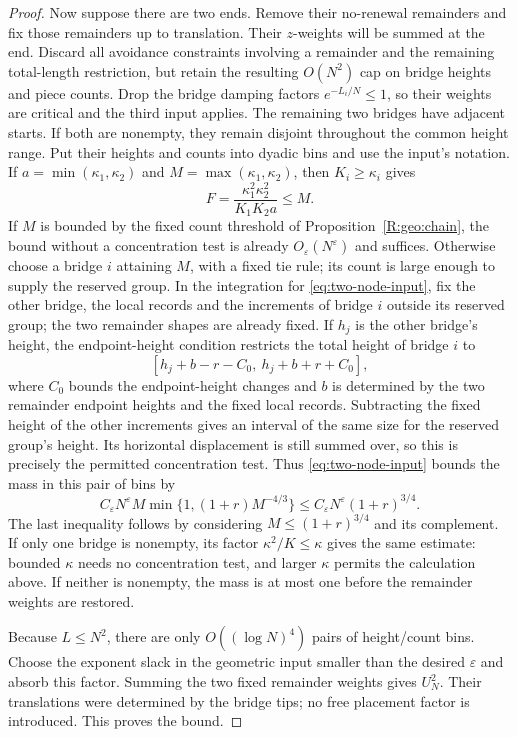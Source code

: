 \begin{proof}
Now suppose there are two ends. Remove their no-renewal remainders and fix those remainders up to translation. Their $z$-weights will be summed at the end. Discard all avoidance constraints involving a remainder and the remaining total-length restriction, but retain the resulting $O(N^2)$ cap on bridge heights and piece counts. Drop the bridge damping factors $e^{-L_i/N}\le1$, so their weights are critical and the third input applies. The remaining two bridges have adjacent starts. If both are nonempty, they remain disjoint throughout the common height range. Put their heights and counts into dyadic bins and use the input's notation. If $a=\min(\kappa_1,\kappa_2)$ and $M=\max(\kappa_1,\kappa_2)$, then $K_i\ge\kappa_i$ gives
\[
 F=\frac{\kappa_1^2\kappa_2^2}{K_1K_2a}\le M.
\]
If $M$ is bounded by the fixed count threshold of Proposition~\ref{R:geo:chain}, the bound without a concentration test is already $O_\varepsilon(N^\varepsilon)$ and suffices. Otherwise choose a bridge $i$ attaining $M$, with a fixed tie rule; its count is large enough to supply the reserved group. In the integration for \eqref{eq:two-node-input}, fix the other bridge, the local records and the increments of bridge $i$ outside its reserved group; the two remainder shapes are already fixed. If $h_j$ is the other bridge's height, the endpoint-height condition restricts the total height of bridge $i$ to
\[
 [h_j+b-r-C_0,\ h_j+b+r+C_0],
\]
where $C_0$ bounds the endpoint-height changes and $b$ is determined by the two remainder endpoint heights and the fixed local records. Subtracting the fixed height of the other increments gives an interval of the same size for the reserved group's height. Its horizontal displacement is still summed over, so this is precisely the permitted concentration test. Thus \eqref{eq:two-node-input} bounds the mass in this pair of bins by
\[
 C_\varepsilon N^\varepsilon M
       \min\{1,(1+r)M^{-4/3}\}
       \le C_\varepsilon N^\varepsilon(1+r)^{3/4}.
\]
The last inequality follows by considering $M\le(1+r)^{3/4}$ and its complement. If only one bridge is nonempty, its factor $\kappa^2/K\le\kappa$ gives the same estimate: bounded $\kappa$ needs no concentration test, and larger $\kappa$ permits the calculation above. If neither is nonempty, the mass is at most one before the remainder weights are restored.

Because $L\le N^2$, there are only $O((\log N)^4)$ pairs of height/count bins. Choose the exponent slack in the geometric input smaller than the desired $\varepsilon$ and absorb this factor. Summing the two fixed remainder weights gives $U_N^2$. Their translations were determined by the bridge tips; no free placement factor is introduced. This proves the bound.
\end{proof}

